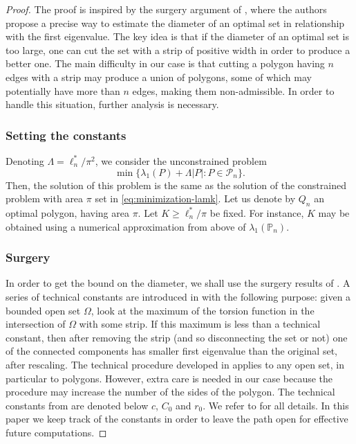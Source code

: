 \documentclass[11pt]{article}
\numberwithin{equation}{section}\newtheorem*{jepEnonce}{\jepEnonceTitle}\newenvironment{enonce*}[1]{\def\jepEnonceTitle{#1}\jepEnonce}{\endjepEnonce}\newtheorem*{conj*}{Conjecture}
\theoremstyle{plain}
\theoremstyle{definition}
\let\Bbb\mathbb
\newcommand{\Om}{\Omega}
\newcommand{\lb}{\lambda}
\begin{document}
\begin{proof}
The proof is inspired by the surgery argument of \cite{BuMa15}, where the authors propose a precise way to estimate the diameter of an optimal set in relationship with the first eigenvalue. The key idea is that if the diameter of an optimal set is too large, one can cut the set with a strip of positive width in order to produce a better one. The main difficulty in our case is that cutting a polygon having $n$ edges with a strip may produce a union of polygons, some of which may potentially have more than $n$ edges, making them non-admissible. In order to handle this situation, further analysis is necessary.

\subsubsection*{Setting the constants}
Denoting $\Lambda= \ell_n^*/\pi^2 $, we consider
the unconstrained problem
\begin{equation}\label{bobu203}
\min \{ \lb_1(P) + \Lambda |P|: P \in {\mathcal P_n}\}.
\end{equation}
Then, the solution of this problem is the same as the solution of the constrained problem with area $\pi$ set in \eqref{eq:minimization-lamk}. Let us denote by $Q_n$ an optimal polygon, having area $\pi$. Let $K \ge \ell_n^*/\pi$ be fixed. For instance, $K$ may be obtained using a numerical approximation from above of $\lb_1(\Bbb P_n)$.

\subsubsection*{Surgery}
In order to get the bound on the diameter, we shall use the surgery results of \cite{BuMa15}. A series of technical constants are introduced in \cite{BuMa15} with the following purpose: given a bounded open set $\Om$, look at the maximum of the torsion function in the intersection of $\Om$ with some strip. If this maximum is less than a technical constant, then after removing the strip (and so disconnecting the set or not) one of the connected components has smaller first eigenvalue than the original set, after rescaling. The technical procedure developed in \cite{BuMa15} applies to any open set, in particular to polygons. However, extra care is needed in our case because the procedure may increase the number of the sides of the polygon. The technical constants from
\cite{BuMa15} are denoted below $c$, $C_0$ and $r_0$. We refer to \cite{BuMa15} for all details. In this paper we keep track of the constants in order to leave the path open for effective future computations.


\end{proof}
\end{document}
